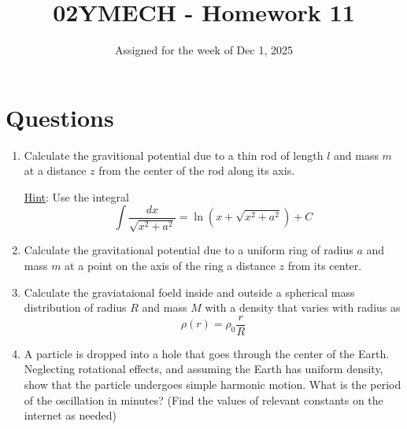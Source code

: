 \documentclass[12pt]{article}
\title{02YMECH - Homework 11}
\date{Assigned for the week of Dec 1, 2025}
\author{}
\begin{document}
\maketitle

\section*{Questions}

\begin{enumerate}
    \item Calculate the gravitional potential due to a thin rod of length $l$ and mass $m$ at a distance $z$ from the center of the rod along its axis.

    \underline{Hint}: Use the integral
    \[\int \frac{dx}{\sqrt{x^2 + a^2}} = \ln\left(x + \sqrt{x^2 + a^2}\right) + C\]
    \item Calculate the gravitational potential due to a uniform ring of radius $a$ and mass $m$ at a point on the axis of the ring a distance $z$ from its center.
    \item Calculate the graviataional foeld inside and outside a spherical mass distribution of radius $R$ and mass $M$ with a density that varies with radius as
    \[\rho(r) = \rho_0 \frac{r}{R}\]
    \item A particle is dropped into a hole that goes through the center of the Earth. Neglecting rotational effects, and assuming the Earth has uniform density, show that the particle undergoes simple harmonic motion. What is the period of the oscillation in minutes? (Find the values of relevant constants on the internet as needed)
\end{enumerate}
\end{document}
